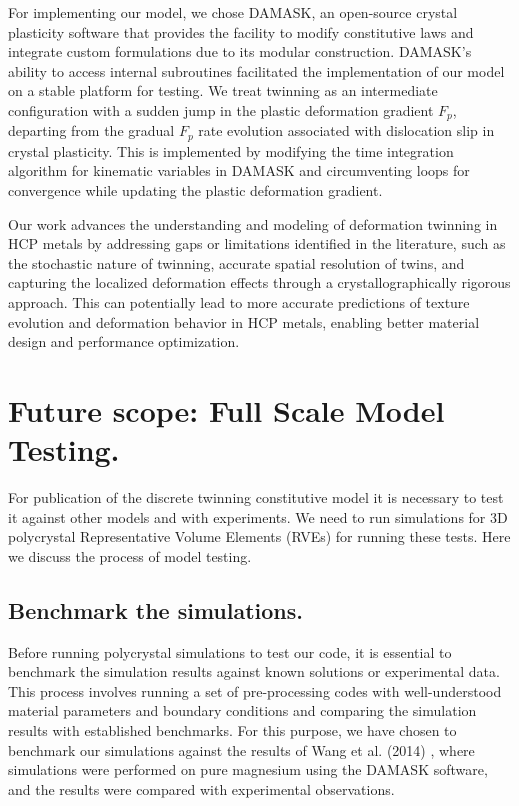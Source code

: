 \vspace{0.2cm}

For implementing our model, we chose DAMASK, an open-source crystal plasticity software that provides the facility to modify constitutive laws and integrate custom formulations due to its modular construction. DAMASK's ability to access internal subroutines facilitated the implementation of our model on a stable platform for testing. We treat twinning as an intermediate configuration with a sudden jump in the plastic deformation gradient $F_p$, departing from the gradual $F_p$ rate evolution associated with dislocation slip in crystal plasticity. This is implemented by modifying the time integration algorithm for kinematic variables in DAMASK and circumventing loops for convergence while updating the plastic deformation gradient.

\vspace{0.2cm}

Our work advances the understanding and modeling of deformation twinning in HCP metals by addressing gaps or limitations identified in the literature, such as the stochastic nature of twinning, accurate spatial resolution of twins, and capturing the localized deformation effects through a crystallographically rigorous approach. This can potentially lead to more accurate predictions of texture evolution and deformation behavior in HCP metals, enabling better material design and performance optimization.

\section{Future scope: Full Scale Model Testing.}
For publication of the discrete twinning constitutive model it is necessary to test it against other models and with experiments. We need to run simulations for 3D polycrystal Representative Volume Elements (RVEs) for running these tests. Here we discuss the process of model testing.

\subsection{Benchmark the simulations.}

Before running polycrystal simulations to test our code, it is essential to benchmark the simulation results against known solutions or experimental data. This process involves running a set of pre-processing codes with well-understood material parameters and boundary conditions and comparing the simulation results with established benchmarks. For this purpose, we have chosen to benchmark our simulations against the results of Wang et al. (2014) \cite{WANG201477}, where simulations were performed on pure magnesium using the DAMASK software, and the results were compared with experimental observations.

